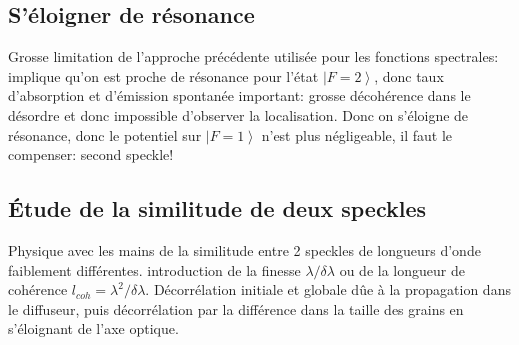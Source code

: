 \subsection{S'éloigner de résonance}
Grosse limitation de l'approche précédente utilisée pour les fonctions spectrales: implique qu'on est proche de résonance pour l'état $\left| F=2 \right\rangle$, donc taux d'absorption et d'émission spontanée important: grosse décohérence dans le désordre et donc impossible d'observer la localisation.
Donc on s'éloigne de résonance, donc le potentiel sur $\left| F=1 \right\rangle$ n'est plus négligeable, il faut le compenser: second speckle! 
\subsection{Étude de la similitude de deux speckles}
Physique avec les mains de la similitude entre 2 speckles de longueurs d'onde faiblement différentes. introduction de la finesse $\lambda / \delta\lambda$ ou de la longueur de cohérence $l_{coh}=\lambda^2/\delta\lambda$.
Décorrélation initiale et globale dûe à la propagation dans le diffuseur, puis décorrélation par la différence dans la taille des grains en s'éloignant de l'axe optique.